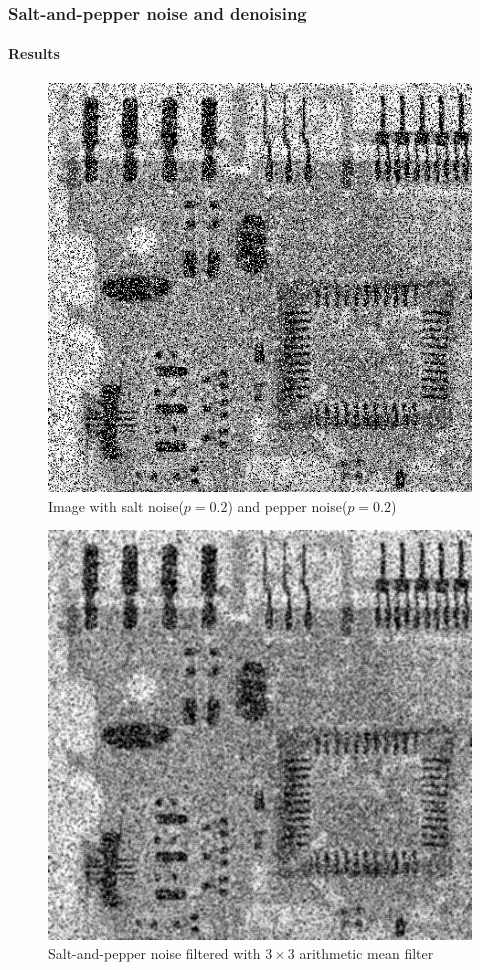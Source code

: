\documentclass{article}
\begin{document}
\subsubsection{Salt-and-pepper noise and denoising}
\paragraph{Results}


\begin{figure}[H]
	\centering
	\includegraphics[width=336pt]{../result/task2/sap/sap-20-20.png}
	\caption{Image with salt noise($p=0.2$) and pepper noise($p=0.2$)}
	\label{fig:sap}
\end{figure}

\begin{figure}[H]
	\centering
	\includegraphics[width=336pt]{../result/task2/sap/sap-arithmetic.png}
	\caption{Salt-and-pepper noise filtered with $3 \times 3$ arithmetic mean filter}
	\label{fig:sapam}
\end{figure}
\end{document}
